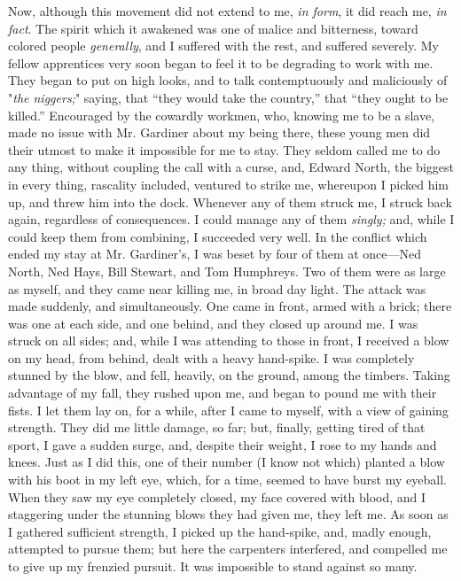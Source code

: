 Now, although this movement did not extend to me, \emph{in form}, it did
reach me, \emph{in fact}. The spirit which it awakened was one of malice
and bitterness, toward colored people \emph{generally}, and I suffered
with the rest, and suffered severely. My fellow apprentices very soon
began to feel it to be degrading to work with me. They began to put on
high looks, and to talk contemptuously and maliciously of "\emph{the
niggers;}" saying, that ``they would take the country,'' that ``they
ought to be killed.'' Encouraged by the cowardly workmen, who, knowing
me to be a slave, made no issue with Mr. Gardiner about my being there,
these young men did their utmost to make it impossible for me to stay.
They seldom called me to do any thing, without coupling the call with a
curse, and, Edward North, the biggest in every thing, rascality
{}included, ventured to strike me, whereupon I picked him up, and threw
him into the dock. Whenever any of them struck me, I struck back again,
regardless of consequences. I could manage any of them \emph{singly;}
and, while I could keep them from combining, I succeeded very well. In
the conflict which ended my stay at Mr. Gardiner's, I was beset by four
of them at once---Ned North, Ned Hays, Bill Stewart, and Tom Humphreys.
Two of them were as large as myself, and they came near killing me, in
broad day light. The attack was made suddenly, and simultaneously. One
came in front, armed with a brick; there was one at each side, and one
behind, and they closed up around me. I was struck on all sides; and,
while I was attending to those in front, I received a blow on my head,
from behind, dealt with a heavy hand-spike. I was completely stunned by
the blow, and fell, heavily, on the ground, among the timbers. Taking
advantage of my fall, they rushed upon me, and began to pound me with
their fists. I let them lay on, for a while, after I came to myself,
with a view of gaining strength. They did me little damage, so far; but,
finally, getting tired of that sport, I gave a sudden surge, and,
despite their weight, I rose to my hands and knees. Just as I did this,
one of their number (I know not which) planted a blow with his boot in
my left eye, which, for a time, seemed to have burst my eyeball. When
they saw my eye completely closed, my face covered with blood, and I
staggering under the stunning blows they had given me, they left me. As
soon as I gathered sufficient strength, I picked up the hand-spike, and,
madly enough, {}attempted to pursue them; but here the carpenters
interfered, and compelled me to give up my frenzied pursuit. It was
impossible to stand against so many.

